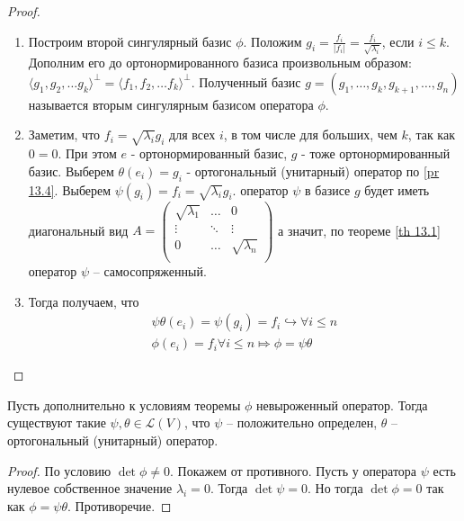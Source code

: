 \begin{proof}
\begin{enumerate}
        \item Построим второй сингулярный базис $\phi$. Положим $g_i = \frac{f_i}{|f_i|} = \frac{f_i}{\sqrt{\lambda_i}}$, 
        если $i \leq k$. Дополним его до ортонормированного базиса произвольным образом: $\langle g_1, g_2, \dots g_k \rangle^{\perp} = \langle f_1, f_2, \dots f_k \rangle^{\perp}$.
        Полученный базис $g = (g_1, \dots, g_k, g_{k + 1}, \dots, g_n)$ называется вторым сингулярным базисом оператора $\phi$.
        \item Заметим, что $f_i = \sqrt{\lambda_i} g_i$ для всех $i$, в том числе для больших, чем $k$, так как $0 = 0$. При этом $e$ - ортонормированный базис, $g$ - тоже ортонормированный базис. Выберем $\theta(e_i) = g_i$ - ортогональный (унитарный)
        оператор по \ref{pr 13.4}. Выберем $\psi(g_i) = f_i = \sqrt{\lambda_i} g_i$. оператор $\psi$ в 
        базисе $g$ будет иметь диагональный вид 
        $A = \begin{pmatrix}
            \sqrt{\lambda_1}     & \dots & 0 \\
            \vdots     & \ddots & \vdots \\
            0 & \dots & \sqrt{\lambda_n} \\
        \end{pmatrix}$
        а значит, по теореме \ref{th 13.1} оператор $\psi$ -- самосопряженный.
        \item Тогда получаем, что
        \begin{gather*}
            \psi \theta (e_i) = \psi(g_i) = f_i \hookrightarrow \forall i \leq n \\
            \phi(e_i) = f_i \forall i \leq n \Mapsto \phi = \psi \theta
        \end{gather*}
    \end{enumerate}
\end{proof}

\begin{corollary}
    Пусть дополнительно к условиям теоремы $\phi$ невыроженный оператор. Тогда существуют такие $\psi, \theta \in \mathcal{L}(V)$, что $\psi$ -- положительно определен, $\theta$ -- ортогональный (унитарный) оператор.
\end{corollary}

\begin{proof}
    По условию $\det \phi \neq 0$. Покажем от противного. Пусть у оператора $\psi$ есть нулевое собственное значение $\lambda_i = 0$. Тогда $\det \psi = 0$. Но тогда $\det \phi = 0$ так как $\phi = \psi \theta$.
    Противоречие.
\end{proof}


